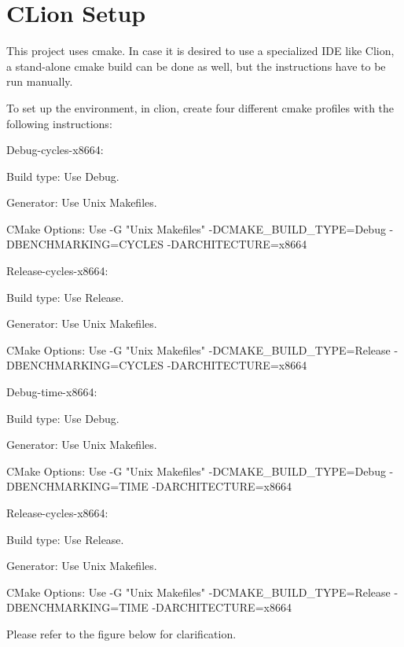 \chapter{CLion Setup}
\hypertarget{md__2home_2liwuen_2projects__dev_2pqc-engineering-ssec-23_2README__Clion__IDE}{}\label{md__2home_2liwuen_2projects__dev_2pqc-engineering-ssec-23_2README__Clion__IDE}
\label{md__2home_2liwuen_2projects__dev_2pqc-engineering-ssec-23_2README__Clion__IDE_autotoc_md42}%
%
 This project uses {\ttfamily cmake}. In case it is desired to use a specialized IDE like Clion, a stand-\/alone {\ttfamily cmake} build can be done as well, but the instructions have to be run manually.

To set up the environment, in clion, create four different cmake profiles with the following instructions\+:


\begin{DoxyItemize}
\item Debug-\/cycles-\/x8664\+:
\begin{DoxyItemize}
\item Build type\+: Use {\ttfamily Debug}.
\item Generator\+: Use {\ttfamily Unix Makefiles}.
\item CMake Options\+: Use {\ttfamily -\/G "{}\+Unix Makefiles"{} -\/DCMAKE\+\_\+\+BUILD\+\_\+\+TYPE=Debug -\/DBENCHMARKING=CYCLES -\/DARCHITECTURE=x8664}
\end{DoxyItemize}
\item Release-\/cycles-\/x8664\+:
\begin{DoxyItemize}
\item Build type\+: Use {\ttfamily Release}.
\item Generator\+: Use {\ttfamily Unix Makefiles}.
\item CMake Options\+: Use {\ttfamily -\/G "{}\+Unix Makefiles"{} -\/DCMAKE\+\_\+\+BUILD\+\_\+\+TYPE=Release -\/DBENCHMARKING=CYCLES -\/DARCHITECTURE=x8664}
\end{DoxyItemize}
\item Debug-\/time-\/x8664\+:
\begin{DoxyItemize}
\item Build type\+: Use {\ttfamily Debug}.
\item Generator\+: Use {\ttfamily Unix Makefiles}.
\item CMake Options\+: Use {\ttfamily -\/G "{}\+Unix Makefiles"{} -\/DCMAKE\+\_\+\+BUILD\+\_\+\+TYPE=Debug -\/DBENCHMARKING=TIME -\/DARCHITECTURE=x8664}
\end{DoxyItemize}
\item Release-\/cycles-\/x8664\+:
\begin{DoxyItemize}
\item Build type\+: Use {\ttfamily Release}.
\item Generator\+: Use {\ttfamily Unix Makefiles}.
\item CMake Options\+: Use {\ttfamily -\/G "{}\+Unix Makefiles"{} -\/DCMAKE\+\_\+\+BUILD\+\_\+\+TYPE=Release -\/DBENCHMARKING=TIME -\/DARCHITECTURE=x8664}
\end{DoxyItemize}
\end{DoxyItemize}

Please refer to the figure below for clarification.

 